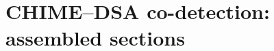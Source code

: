 \documentclass{article}
\begin{document}
\section*{CHIME--DSA co-detection: assembled sections}



\end{document}
